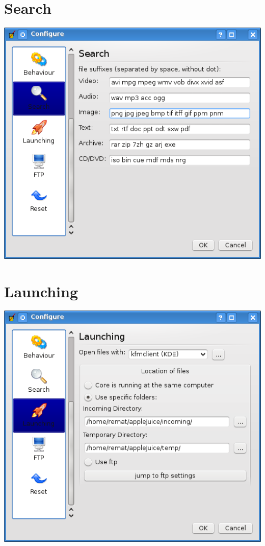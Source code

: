 \documentclass[a4paper,10pt]{book}
\begin{document}
\section{Search}
\label{sec:conf_search}
\includegraphics[width=1.0\textwidth]{./images/configure_search.png}

\section{Launching}
\label{sec:conf_launching}
\includegraphics[width=1.0\textwidth]{./images/configure_launching.png}
\end{document}
